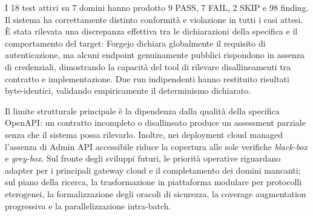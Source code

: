\documentclass{scrartcl}
\begin{document}
I 18 test attivi su 7 domini hanno prodotto 9 PASS, 7 FAIL, 2 SKIP e 98 finding. Il sistema ha correttamente distinto conformità e violazione in tutti i casi attesi. È stata rilevata una discrepanza effettiva tra le dichiarazioni della specifica e il comportamento del target: Forgejo dichiara globalmente il requisito di autenticazione, ma alcuni endpoint genuinamente pubblici rispondono in assenza di credenziali, dimostrando la capacità del tool di rilevare disallineamenti tra contratto e implementazione. Due run indipendenti hanno restituito risultati byte-identici, validando empiricamente il determinismo dichiarato.

Il limite strutturale principale è la dipendenza dalla qualità della specifica OpenAPI: un contratto incompleto o disallineato produce un assessment parziale senza che il sistema possa rilevarlo. Inoltre, nei deployment cloud managed l'assenza di Admin API accessibile riduce la copertura alle sole verifiche \textit{black-box} e \textit{grey-box}. Sul fronte degli sviluppi futuri, le priorità operative riguardano adapter per i principali gateway cloud e il completamento dei domini mancanti; sul piano della ricerca, la trasformazione in piattaforma modulare per protocolli eterogenei, la formalizzazione degli oracoli di sicurezza, la coverage augmentation progressiva e la parallelizzazione intra-batch.
\end{document}
